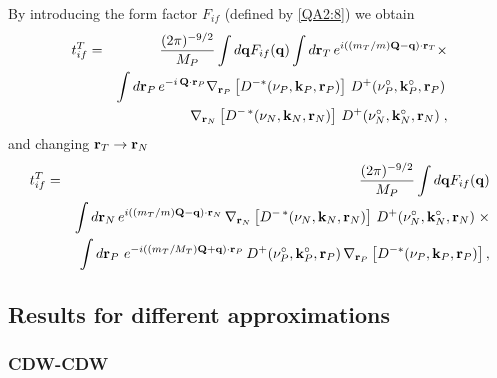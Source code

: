 By introducing the form factor $F_{if}$ (defined by \ref{QA2:8}) we
obtain
\begin{eqnarray}\label{Q:tt_if}
t^{T}_{if}&=& \frac{(2 \pi)^{-9/2}}{M_{P}} \int d \mathbf{q}
F_{if}(\mathbf{q}) \int d \mathbf{r}_{T} \, e^{i \left(
(m_{T}/m)\mathbf{Q} - \mathbf{q} \right) \cdot \mathbf{r}_{T}} {\times}
  \\
&& \int d \mathbf{r}_{P} \, e^{- i \, \mathbf{Q} \cdot \mathbf{r}_{P}}
\nabla_{\mathbf{r}_{P}}\left[ D^{-*}(\nu_{P},\mathbf{k}_{P},\mathbf{r}_{P}) \right]
\,
D^{+}(\nu_{P}^{\circ},\mathbf{k}_{P}^{\circ},\mathbf{r}_{P}) \, \\
&& \nabla_{\mathbf{r}_{N}} \left[ D^{-\,\ast}(\nu_{N}, \mathbf{k}_{N},
\mathbf{r}_{N} ) \right] \, D^{+}(\nu_{N}^{\circ}, \mathbf{k}_{N}^{\circ}, \mathbf{r}_{N}) \;
,\nonumber
\end{eqnarray}
%
and changing $\mathbf{r}_{T}\to \mathbf{r}_{N}$
\begin{eqnarray} \label{Q:tifcdws2}
t^{T}_{if}&=& \frac{(2 \pi)^{-9/2}}{M_{P}} \int d \mathbf{q}
F_{if}(\mathbf{q})
\\
&& \int d \mathbf{r}_{N} \, e^{i \left( (m_{T}/m)\mathbf{Q} - \mathbf{q}
\right) \cdot \mathbf{r}_{N}} \, \nabla_{\mathbf{r}_{N}} \left[
D^{-\,\ast}(\nu_{N}, \mathbf{k}_{N}, \mathbf{r}_{N} ) \right] \,
D^{+}(\nu_{N}^{\circ},\mathbf{k}_{N}^{\circ},\mathbf{r}_{N})\; {\times}
  \\
&& \int d \mathbf{r}_{P} \, \,e^{ -i \left((m_{T}/M_{T})\mathbf{Q}+
\mathbf{q} \right) \cdot \mathbf{r}_{P}} \,
D^{+}(\nu_{P}^{\circ},\mathbf{k}_{P}^{\circ},\mathbf{r}_{P}) \, \nabla_{\mathbf{r}_{P}}\left[
D^{-*}(\nu_{P},\mathbf{k}_{P},\mathbf{r}_{P}) \right] ,\nonumber
\end{eqnarray}

\subsection{Results for different approximations}


\subsubsection{CDW-CDW}

